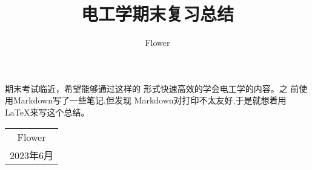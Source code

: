 \documentclass{ctexart}%
\date{}
\title{电工学期末复习总结}
\author{Flower}
\begin{document}
\maketitle
\begin{center}
    期末考试临近，希望能够通过这样的
形式快速高效的学会电工学的内容。之
前使用Markdown写了一些笔记,但发现
Markdown对打印不太友好,于是就想着用
\LaTeX{}来写这个总结。
\end{center}
\begin{flushright}
    \begin{tabular}{c}
        Flower\\
        2023年6月
    \end{tabular}
\end{flushright}

\newpage
\tableofcontents
\newpage








\newpage
\end{document}
